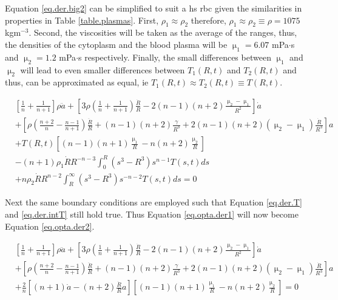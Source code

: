 Equation \ref{eq.der.big2} can be simplified to suit a \ac{hs} \ac{rbc} given the similarities in properties in Table \ref{table.plasmas}. First,  $\rho_1 \approx \rho_2$ therefore, $\rho_1 \approx \rho_2 \equiv \rho = 1075$ kgm$^{-3}$. Second, the viscosities will be taken as the average of the ranges, thus, the densities of the cytoplasm and the blood plasma will be $\upmu_1 = 6.07$ mPa$\cdot$s and $\upmu_2 = 1.2$ mPa$\cdot$s respectively. Finally, the small differences between $\upmu_1$ and $\upmu_2$ will lead to even smaller differences between $T_1(R,t)$ and $T_2(R,t)$ and thus, can be approximated as equal, ie $T_1(R,t) \approx T_2(R,t) \equiv T(R,t)$. 


\begin{equation} \label{eq.opta.der1}
\begin{split}
&\left[ \frac{1}{n} + \frac{1}{n+1} \right] \rho \ddot{a} + \left[3 \rho \left( \frac{1}{n} + \frac{1}{n+1} \right) \frac{\dot{R}}{R} - 2(n-1)(n+2) \frac{\upmu_2 - \upmu_1}{R^2} \right]\dot{a}  \\ & +\left[ \rho \left(  \frac{n+2}{n} - \frac{n-1}{n+1} \right)\frac{\ddot{R}}{R} + (n-1)(n+2)\frac{\gamma}{R^3} + 2(n-1)(n+2)(\upmu_2 -\upmu_1)\frac{\dot{R}}{R^3}  \right] a  \\& + T(R,t) \left[ (n-1)(n+1)\frac{\upmu_1}{R} - n(n+2)\frac{\upmu_2}{R} \right]  \\ & - (n+1)\rho_1\dot{R}R^{-n-3} \int_0^R (s^3-R^3)s^{n-1}T(s,t)ds \\ & + n\rho_2 \dot{R}R^{n-2} \int_{R}^{\infty} (s^3 - R^3)s^{-n-2} T(s,t) ds = 0 
\end{split}
\end{equation}

\noindent Next the same boundary conditions are employed such that Equation \ref{eq.der.T} and \ref{eq.der.intT} still hold true. Thus Equation \ref{eq.opta.der1} will now become Equation \ref{eq.opta.der2}.

\begin{equation} \label{eq.opta.der2}
\begin{split}
&\left[ \frac{1}{n} + \frac{1}{n+1} \right] \rho \ddot{a} + \left[3 \rho \left( \frac{1}{n} + \frac{1}{n+1} \right) \frac{\dot{R}}{R} - 2(n-1)(n+2) \frac{\upmu_2 - \upmu_1}{R^2} \right]\dot{a}  \\ & +\left[ \rho \left(  \frac{n+2}{n} - \frac{n-1}{n+1} \right)\frac{\ddot{R}}{R} + (n-1)(n+2)\frac{\gamma}{R^3} + 2(n-1)(n+2)(\upmu_2 -\upmu_1)\frac{\dot{R}}{R^3}  \right] a  \\& + \frac{2}{n}\left[(n+1)\dot{a} - (n+2)\frac{\dot{R}}{R} a\right] \left[ (n-1)(n+1)\frac{\upmu_1}{R} - n(n+2)\frac{\upmu_2}{R} \right]  = 0 
\end{split}
\end{equation}

